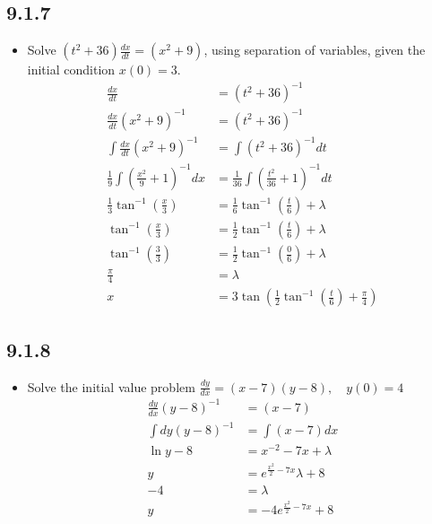 \begin{itemize}
\begin{itemize}
  \end{itemize}

  \subsection{9.1.7}
  \begin{itemize}
    \item Solve \( (t^2 + 36)\frac{dx}{dt} = (x^2+9) \), using separation of
      variables, given the initial condition \( x(0)=3 \).
      \begin{align*}
        \frac{dx}{dt} &= \left( t^2+36 \right)^{-1} \\
        \frac{dx}{dt} \left( x^2 + 9 \right)^{-1} &= (t^2 + 36)^{-1} \\
        \int\frac{dx}{dt} \left( x^2 + 9 \right)^{-1} &= \int (t^2 + 36)^{-1}dt \\
        \frac{1}{9}\int \left(\frac{x^2}{9}+1\right)^{-1}dx &= \frac{1}{36} \int \left(\frac{t^2}{36} + 1\right)^{-1} dt \\
        \frac{1}{3}\tan ^{-1}\left( \frac{x}{3} \right) &= \frac{1}{6} \tan ^{-1} \left( \frac{t}{6} \right) + \lambda \\
        \tan ^{-1} \left( \frac{x}{3} \right) &= \frac{1}{2}\tan ^{-1}\left( \frac{t}{6} \right) + \lambda \\
        \tan ^{-1} \left( \frac{3}{3} \right) &= \frac{1}{2}\tan ^{-1}\left( \frac{0}{6} \right) + \lambda \\
        \frac{\pi}{4} &= \lambda \\
        x &= 3\tan \left( \frac{1}{2}\tan ^{-1}\left( \frac{t}{6} \right) + \frac{\pi}{4} \right)
      \end{align*}
  \end{itemize}

  \subsection{9.1.8}
  \begin{itemize}
    \item Solve the initial value problem \( \frac{dy}{dx} = \left( x-7 \right) (y-8), \quad y\left( 0 \right) = 4 \)
      \begin{align*}
        \frac{dy}{dx} \left( y-8 \right) ^{-1} &= \left( x-7 \right) \\
        \int dy \left( y-8 \right) ^{-1} &= \int \left( x-7 \right) dx\\
        \ln y-8 &= x^{-2} -7x + \lambda \\
        y &= e^{\frac{x^2}{2}-7x}\lambda + 8 \\
        -4 &= \lambda \\
        y &= -4e^{\frac{x^2}{2}-7x} + 8
      \end{align*}
  \end{itemize}


\end{itemize}

